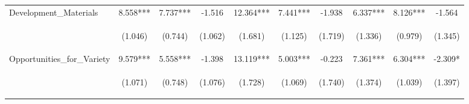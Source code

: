 \begin{tabular}{lccccccccc}
\noalign{\smallskip}Development\_Materials & 8.558*** & 7.737*** & -1.516 & 12.364*** & 7.441*** & -1.938 & 6.337*** & 8.126*** & -1.564\\
 & \begin{footnotesize}(1.046)\end{footnotesize} & \begin{footnotesize}(0.744)\end{footnotesize} & \begin{footnotesize}(1.062)\end{footnotesize} & \begin{footnotesize}(1.681)\end{footnotesize} & \begin{footnotesize}(1.125)\end{footnotesize} & \begin{footnotesize}(1.719)\end{footnotesize} & \begin{footnotesize}(1.336)\end{footnotesize} & \begin{footnotesize}(0.979)\end{footnotesize} & \begin{footnotesize}(1.345)\end{footnotesize}\\
\noalign{\smallskip}Opportunities\_for\_Variety & 9.579*** & 5.558*** & -1.398 & 13.119*** & 5.003*** & -0.223 & 7.361*** & 6.304*** & -2.309*\\
 & \begin{footnotesize}(1.071)\end{footnotesize} & \begin{footnotesize}(0.748)\end{footnotesize} & \begin{footnotesize}(1.076)\end{footnotesize} & \begin{footnotesize}(1.728)\end{footnotesize} & \begin{footnotesize}(1.069)\end{footnotesize} & \begin{footnotesize}(1.740)\end{footnotesize} & \begin{footnotesize}(1.374)\end{footnotesize} & \begin{footnotesize}(1.039)\end{footnotesize} & \begin{footnotesize}(1.397)\end{footnotesize}\\

\end{tabular}
